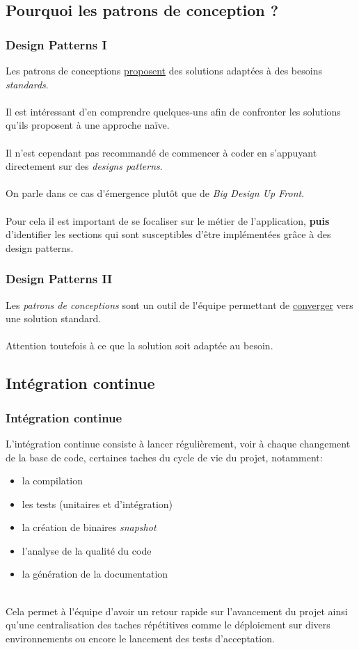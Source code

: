 \subsection{Pourquoi les patrons de conception ?}
\begin{frame}
	\frametitle{Design Patterns I}
    Les patrons de conceptions \underline{proposent} des solutions adapt\'{e}es \`{a} des besoins \textit{standards}.
    \\~\\
    Il est int\'{e}ressant d'en comprendre quelques-uns afin de confronter les solutions qu'ils proposent \`{a} une approche na\"{i}ve.
    \\~\\
    Il n'est cependant pas recommand\'{e} de commencer \`{a} coder en s'appuyant directement sur des \textit{designs patterns}.
    \\~\\
    On parle dans ce cas d\'{}\'{e}mergence plut\^{o}t que de \textit{Big Design Up Front}.
    \\~\\
    Pour cela il est important de se focaliser sur le m\'{e}tier de l'application, \textbf{puis} d'identifier les sections qui sont susceptibles d'\^{e}tre impl\'{e}ment\'{e}es gr\^{a}ce \`{a} des design patterns.
\end{frame}

\begin{frame}
	\frametitle{Design Patterns II}
    Les \textit{patrons de conceptions} sont un outil de l\'{}\'{e}quipe permettant de \underline{converger} vers une solution standard.
    \\~\\
    Attention toutefois \`{a} ce que la solution soit adapt\'{e}e au besoin.
\end{frame}

\subsection{Int\'{e}gration continue}
\begin{frame}
	\frametitle{Int\'{e}gration continue}
    L'int\'{e}gration continue consiste \`{a} lancer r\'{e}guli\`{e}rement, voir \`{a} chaque changement de la base de code, certaines taches du cycle de vie du projet, notamment:
    \begin{itemize}
        \item la compilation
        \item les tests (unitaires et d'int\'{e}gration)
        \item la cr\'{e}ation de binaires \textit{snapshot}
        \item l'analyse de la qualit\'{e} du code
        \item la g\'{e}n\'{e}ration de la documentation
    \end{itemize}
    ~\\
    Cela permet \`{a} l\'{}\'{e}quipe d'avoir un retour rapide sur l'avancement du projet ainsi qu'une centralisation des taches r\'{e}p\'{e}titives comme le d\'{e}ploiement sur divers environnements ou encore le lancement des tests d'acceptation.
\end{frame}

